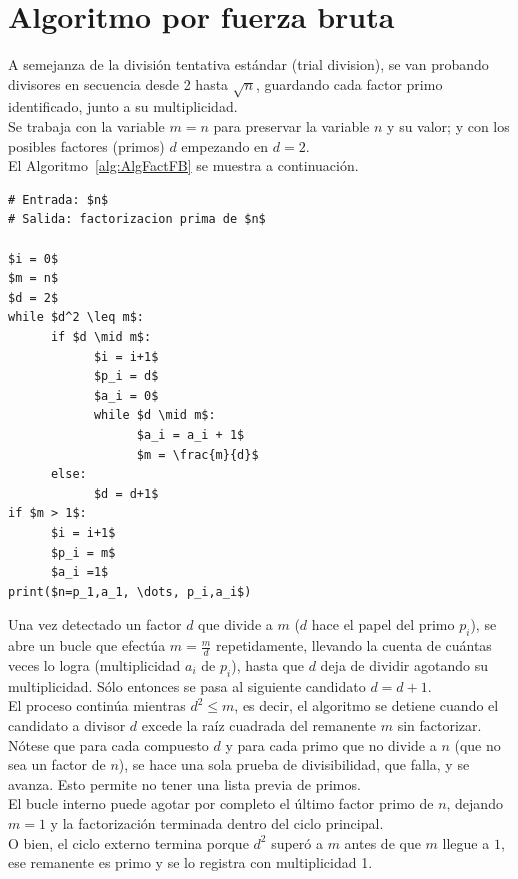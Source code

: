 \section{Algoritmo por fuerza bruta}
A semejanza de la división tentativa estándar (trial division), se van probando divisores en secuencia desde 2 hasta $\sqrt{n}$, guardando cada factor primo identificado, junto a su multiplicidad. \\
Se trabaja con la variable $m=n$ para preservar la variable $n$ y su valor; y con los posibles factores (primos) $d$ empezando en $d=2$. \\
El Algoritmo~\ref{alg:AlgFactFB} se muestra a continuación.

\begin{lstlisting}[caption={Algoritmo por fuerza bruta}, label={alg:AlgFactFB}, mathescape=true]
# Entrada: $n$
# Salida: factorizacion prima de $n$

$i = 0$
$m = n$
$d = 2$
while $d^2 \leq m$:
      if $d \mid m$:
            $i = i+1$
            $p_i = d$
            $a_i = 0$
            while $d \mid m$:
                  $a_i = a_i + 1$
                  $m = \frac{m}{d}$
      else:
            $d = d+1$
if $m > 1$:
      $i = i+1$
      $p_i = m$
      $a_i =1$
print($n=p_1,a_1, \dots, p_i,a_i$)
\end{lstlisting}

Una vez detectado un factor $d$ que divide a $m$ ($d$ hace el papel del primo $p_i$), se abre un bucle que efectúa $m = \frac{m}{d}$ repetidamente, llevando la cuenta de cuántas veces lo logra (multiplicidad $a_i$ de $p_i$), hasta que $d$ deja de dividir agotando su multiplicidad. Sólo entonces se pasa al siguiente candidato $d=d+1$. \\
El proceso continúa mientras $d^2 \leq m$, es decir, el algoritmo se detiene cuando el candidato a divisor $d$ excede la raíz cuadrada del remanente $m$ sin factorizar. \\
Nótese que para cada compuesto $d$ y para cada primo que no divide a $n$ (que no sea un factor de $n$), se hace una sola prueba de divisibilidad, que falla, y se avanza. Esto permite no tener una lista previa de primos. \\
El bucle interno puede agotar por completo el último factor primo de $n$, dejando $m=1$ y la factorización terminada dentro del ciclo principal. \\
O bien, el ciclo externo termina porque $d^2$ superó a $m$ antes de que $m$ llegue a $1$, ese remanente es primo y se lo registra con multiplicidad 1.

